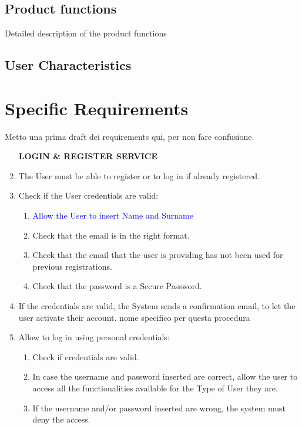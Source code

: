 \documentclass[a4paper, 10pt, oneside]{article}
\newcommand*{\lorenzo}[1]{\textcolor{BurntOrange}{#1}}
\newcommand{\giovanni}[1]{\textcolor{Blue}{#1}}
\begin{document}
\subsection{Product functions}
Detailed description of the product functions

\subsection{User Characteristics}

\section{Specific Requirements}
\label{specificRequirements}

\lorenzo{Metto una prima draft dei requirements qui, per non fare confusione.}
\begin{enumerate}[align=left]
    \item[\textbf{LOGIN \& REGISTER SERVICE}]
    \item The User must be able to register or to log in if already registered.
    \item \label{credentials} Check if the User credentials are valid:
    \begin{enumerate}[label={-}]
        \item \giovanni{Allow the User to insert Name and Surname}
        \item Check that the email is in the right format.
        \item Check that the email that the user is providing has not been used for previous registrations.
        \item Check that the password is a Secure Password.
    \end{enumerate}
    \item If the credentials are valid, the System sends a confirmation email, to let the user activate their account. \lorenzo{nome specifico per questa procedura}
    \item Allow to log in using personal credentials:
    \begin{enumerate}[label={-}]
        \item Check if credentials are valid.
        \item In case the username and password inserted are correct, allow the user to access all the functionalities available for the Type of User they are.
        \item If the username and/or password inserted are wrong, the system must deny the access.

\end{enumerate}
\end{enumerate}
\end{document}

